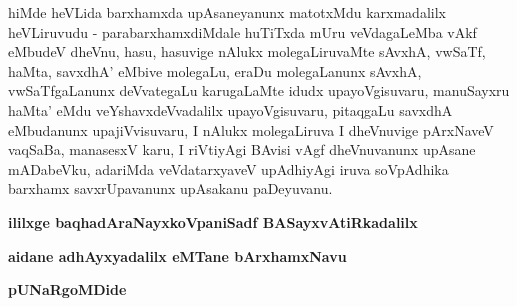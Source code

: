 
\begin{artha}
hiMde heVLida barxhamxda upAsaneyanunx matotxMdu karxmadalilx heVLiruvudu - parabarxhamxdiMdale huTiTxda mUru veVdagaLeMba vAkf eMbudeV dheVnu, hasu, hasuvige nAlukx molegaLiruvaMte sAvxhA, vwSaTf, haMta, savxdhA' eMbive molegaLu, eraDu molegaLanunx sAvxhA, vwSaTfgaLanunx deVvategaLu karugaLaMte idudx upayoVgisuvaru, manuSayxru haMta' eMdu veYshavxdeVvadalilx upayoVgisuvaru, pitaqgaLu savxdhA eMbudanunx upajiVvisuvaru, I nAlukx molegaLiruva I dheVnuvige pArxNaveV vaqSaBa, manasesxV karu, I riVtiyAgi BAvisi vAgf dheVnuvanunx upAsane mADabeVku, adariMda veVdatarxyaveV upAdhiyAgi iruva soVpAdhika barxhamx savxrUpavanunx upAsakanu paDeyuvanu.
\end{artha}

\begin{center}
{\bf ililxge baqhadAraNayxkoVpaniSadf BASayxvAtiRkadalilx}
\smallskip

{\bf aidane adhAyxyadalilx eMTane bArxhamxNavu}

{\bf pUNaRgoMDide}
\end{center}
